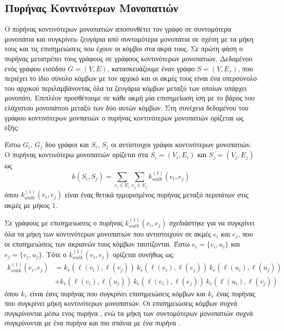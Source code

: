 \subsection{Πυρήνας Κοντινότερων Μονοπατιών}
Ο πυρήνας κοντινότερων μονοπατιών  αποσυνθέτει τον γράφο σε συντομότερα μονοπάτια και συγκρίνειs ζευγάρια από συντομότερα μονοπάτια σε σχέση με τα μήκη τους και τις επισημειώσεις που έχουν οι κόμβοι στα ακρά τους.
Σε πρώτη φάση ο πυρήνας μετατρέπει τους γράφους σε γράφους κοντινότερων μονοπατιών.
Δεδομένου ενός γράφου εισόδου $G=(V,E)$, κατασκευάζουμε έναν γράφο  $S=(V,E_s)$, που περιέχει το ίδιο σύνολο κόμβων με τον αρχικό και οι ακμές τους είναι ένα υπερσύνολο του αρχικού περιλαμβάνοντας όλα τα ζευγάρια κόμβων μεταξύ των οποίων υπάρχει μονοπάτι.
Επιπλέον προσθέτουμε σε κάθε ακμή μία επισημείωση ίση με το βάρος του ελάχιστου μονοπάτιου μεταξύ των δύο αυτών κόμβων.
Στη συνέχεια δεδομένου του γράφου κοντινότερων μονπατιών ο πυρήνας κοντινότερων μονοπατιών ορίζεται ως εξής:
\begin{definition}
	Έστω $G_i$, $G_j$ δύο γράφοι και $S_i$, $S_j$ οι αντίστοιχοι γράφοι κοντινότερων μονοπατιών.
	Ο πυρήνας κοντινότερω μονοπατιών ορίζεται στα $S_i=(V_i,E_i)$ και $S_j=(V_j,E_j)$ ως
	\begin{equation}
		k(S_i,S_j) = \sum_{e_i \in E_i} \sum_{e_j \in E_j} k_{walk}^{(1)}(e_i, e_j)
	\end{equation}
	όπου $k_{walk}^{(1)}(e_i, e_j)$ είναι ένας θετικά ηιμορισμένος πυρήνας μεταξύ περιπάτων στις ακμές με μήκος $1$.
\end{definition}
Σε γράφους με επισημειωσεις ο πυρήνας $k_{walk}^{(1)}(e_i, e_j)$ σχεδιάστηκε για να συγκρίνει όλα τα μήκη των κοντινότερων μονοπατιών που αντιστοιχούν σε ακμές $e_i$ και $e_j$, που οι επισημειώσεις των ακριανών τους κόμβων ταυτίζονται.
Έστω $e_i = \{v_i, u_i\}$ και $e_j = \{v_j, u_j\}$.
Τότε ο $k_{walk}^{(1)}(e_i, e_j)$ ορίζεται συνήθως ως:
\begin{equation}
\begin{split}
	k_{walk}^{(1)}(e_i, e_j) &= k_v(\ell(v_i),\ell(v_j)) \ k_e(\ell(e_i),\ell(e_j)) \ k_v(\ell(u_i),\ell(u_j)) \\
	&+ k_v(\ell(v_i),\ell(u_j)) \ k_e(\ell(e_i),\ell(e_j)) \ k_v(\ell(u_i),\ell(v_j))
\end{split}
\end{equation}
όπου $k_v$ είναι έανς πυρήνας που συγκρίνει επισημειώσεις κόμβων και $k_e$ ένας πυρήνας που συγκρίνει μήκη κοντινότερων μονοπατιών.
Οι επισημειώσεις κόμβων συχνά συγκρίνονται μέσω ενος πυρήνα , ενώ τα μήκη των συντομότερων μονοπατιών συχνά συγκρίνονται με ένα πυρήνα  και πιο σπάνια με ένα πυρήνα  \cite{borgwardt2005shortest}.
